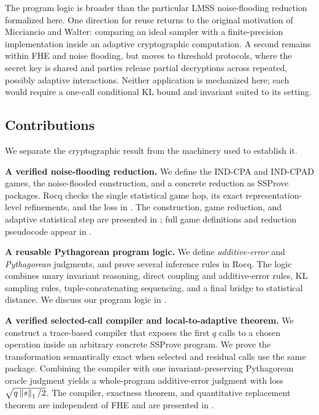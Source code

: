 The program logic is broader than the particular LMSS noise-flooding reduction
formalized here.
One direction for reuse returns to the original motivation of Micciancio and
Walter: comparing an ideal sampler with a finite-precision implementation inside
an adaptive cryptographic computation.
A second remains within FHE and noise flooding, but moves to threshold
protocols, where the secret key is shared and parties release partial
decryptions across repeated, possibly adaptive interactions.
Neither application is mechanized here; each would require a one-call
conditional KL bound and invariant suited to its setting.



\subsection{Contributions}

We separate the cryptographic result from the machinery used to establish it.

\textbf{A verified noise-flooding reduction.} We define the IND-CPA and IND-CPAD games, the noise-flooded construction, and a concrete reduction as SSProve packages.
Rocq checks the single statistical game hop, its exact representation-level
refinements, and the loss in .
The construction, game reduction, and adaptive statistical step are presented
in ; full game
definitions and reduction pseudocode appear in .

\textbf{A reusable Pythagorean program logic.}
We define \emph{additive-error} and \emph{Pythagorean} judgments, and prove
several inference rules in Rocq.
The logic combines unary invariant reasoning,
direct coupling and additive-error rules, KL sampling rules, tuple-concatenating
sequencing, and a final bridge to statistical distance.
We discuss our program logic in .

\textbf{A verified selected-call compiler and local-to-adaptive theorem.}
We construct a trace-based compiler that exposes the first \(q\) calls to a
chosen operation inside an arbitrary concrete SSProve program.  We prove the
transformation semantically exact when selected and residual calls use the
same package.  Combining the compiler with one
invariant-preserving Pythagorean oracle judgment yields a whole-program
additive-error judgment with loss \(\sqrt{q\left\lVert s\right\rVert_1/2}\).  The compiler,
exactness theorem, and quantitative replacement theorem are independent of
FHE and are presented in .

